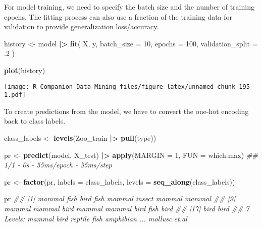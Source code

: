 \documentclass[
  notitlepage]{book}
\newenvironment{Shaded}{\begin{snugshade}}{\end{snugshade}}
\newcommand{\CommentTok}[1]{\textcolor[rgb]{0.56,0.35,0.01}{\textit{#1}}}
\newcommand{\DataTypeTok}[1]{\textcolor[rgb]{0.13,0.29,0.53}{#1}}
\newcommand{\DecValTok}[1]{\textcolor[rgb]{0.00,0.00,0.81}{#1}}
\newcommand{\ErrorTok}[1]{\textcolor[rgb]{0.64,0.00,0.00}{\textbf{#1}}}
\newcommand{\FloatTok}[1]{\textcolor[rgb]{0.00,0.00,0.81}{#1}}
\newcommand{\KeywordTok}[1]{\textcolor[rgb]{0.13,0.29,0.53}{\textbf{#1}}}
\newcommand{\NormalTok}[1]{#1}
\newcommand{\OperatorTok}[1]{\textcolor[rgb]{0.81,0.36,0.00}{\textbf{#1}}}
\newcommand{\StringTok}[1]{\textcolor[rgb]{0.31,0.60,0.02}{#1}}
\begin{document}
For model training, we need to specify the batch size and the number of
training epochs. The fitting process can also use a fraction of the
training data for validation to provide generalization loss/accuracy.

\begin{Shaded}
\begin{Highlighting}[]
\NormalTok{history \textless{}{-}}\StringTok{ }\NormalTok{model }\OperatorTok{|}\ErrorTok{\textgreater{}}
\StringTok{  }\KeywordTok{fit}\NormalTok{(}
\NormalTok{    X, }
\NormalTok{    y,}
    \DataTypeTok{batch\_size =} \DecValTok{10}\NormalTok{,}
    \DataTypeTok{epochs =} \DecValTok{100}\NormalTok{,}
    \DataTypeTok{validation\_split =} \FloatTok{.2}
\NormalTok{  )}

\KeywordTok{plot}\NormalTok{(history)}
\end{Highlighting}
\end{Shaded}

\texttt{[image: R-Companion-Data-Mining\_files/figure-latex/unnamed-chunk-195-1.pdf]}

To create predictions from the model, we have to convert the one-hot
encoding back to class labels.

\begin{Shaded}
\begin{Highlighting}[]
\NormalTok{class\_labels \textless{}{-}}\StringTok{ }\KeywordTok{levels}\NormalTok{(Zoo\_train }\OperatorTok{|}\ErrorTok{\textgreater{}}\StringTok{ }\KeywordTok{pull}\NormalTok{(type))}

\NormalTok{pr \textless{}{-}}\StringTok{ }\KeywordTok{predict}\NormalTok{(model, X\_test) }\OperatorTok{|}\ErrorTok{\textgreater{}}\StringTok{ }
\StringTok{  }\KeywordTok{apply}\NormalTok{(}\DataTypeTok{MARGIN =} \DecValTok{1}\NormalTok{, }\DataTypeTok{FUN =}\NormalTok{ which.max)}
\CommentTok{\#\# 1/1 {-} 0s {-} 55ms/epoch {-} 55ms/step}
\end{Highlighting}
\end{Shaded}

\begin{Shaded}
\begin{Highlighting}[]
\NormalTok{pr \textless{}{-}}\StringTok{ }\KeywordTok{factor}\NormalTok{(pr, }\DataTypeTok{labels =}\NormalTok{ class\_labels, }\DataTypeTok{levels =} \KeywordTok{seq\_along}\NormalTok{(class\_labels))}

\NormalTok{pr}
\CommentTok{\#\#  [1] mammal fish   bird   fish   mammal insect mammal mammal}
\CommentTok{\#\#  [9] mammal mammal bird   mammal mammal bird   fish   bird  }
\CommentTok{\#\# [17] bird   bird  }
\CommentTok{\#\# 7 Levels: mammal bird reptile fish amphibian ... mollusc.et.al}
\end{Highlighting}
\end{Shaded}
\end{document}
